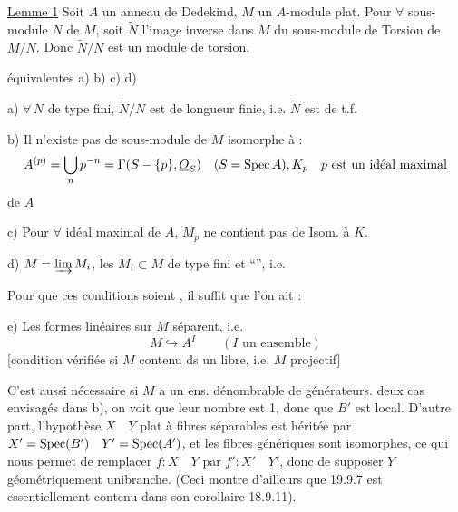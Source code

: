 \deleted{\[f(gh)=\sum f_i(g)\varphi_i(h),\]}

\uline{Lemme 1} Soit $A$ un anneau de Dedekind, $M$ un $A$-module plat.  Pour $\forall$ sous-module $N$ de $M$, soit $\tilde N$ l'image inverse dans $M$ du sous-module de Torsion de $M/N$. Donc $\tilde N/N$ est un module de torsion.

 équivalentes a) b) c) d)

a) $\forall\,N$ de type fini, $\tilde N/N$ est de longueur finie, i.e. $\tilde N$ est de t.f.

b)  Il n'existe pas de sous-module de $M$ isomorphe à :
\[
A^{(p)}=\bigcup_n p^{-n}=\Gamma(S-\{p\},\underline O_S)\quad(S=\operatorname{Spec}A),
K_p\quad p\text{ est un idéal maximal}
\]
de $A$ 

c)  Pour $\forall$ idéal maximal  de $A$, $M_p$ ne contient pas de  Isom. à $K$.

d) $M=\varinjlim M_i$, les $M_i\subset M$ de type fini et ``'', i.e. 

Pour que ces conditions soient , il suffit que l'on ait :

e) Les formes linéaires sur $M$ séparent, i.e.
\[
M\hookrightarrow A^I\qquad(I\text{ un ensemble})
\]
[condition vérifiée si $M$ contenu ds un libre,  i.e. $M$ projectif]

C'est aussi nécessaire si $M$ a un ens. dénombrable de générateurs.
deux cas envisagés dans b), on voit que leur nombre est 1, donc que $B'$ est local. D'autre part, l'hypothèse $X\quad Y$ plat à fibres séparables est héritée par $X'=\operatorname{Spec}(B')\quad Y'=\operatorname{Spec}(A')$, et les fibres génériques sont isomorphes, ce qui nous permet de remplacer $f:X\quad Y$ par $f':X'\quad Y'$, donc de supposer $Y$ géométriquement unibranche. (Ceci montre d'ailleurs que 19.9.7 est essentiellement contenu dans son corollaire 18.9.11).

